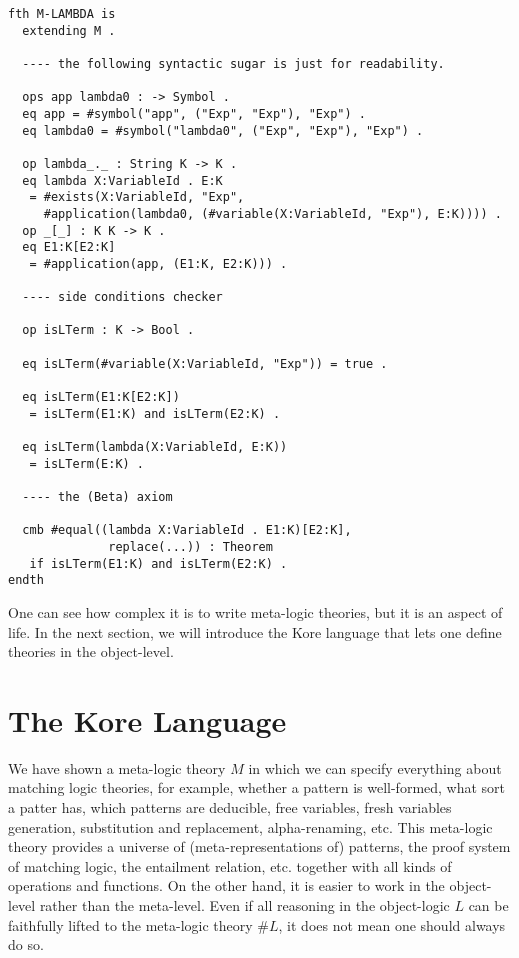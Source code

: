 \documentclass[UTF8]{article}
\theoremstyle{plain}
\theoremstyle{definition}
\theoremstyle{remark}
\begin{document}
\begin{Verbatim}[fontsize=\small]
fth M-LAMBDA is
  extending M .
  
  ---- the following syntactic sugar is just for readability. 

  ops app lambda0 : -> Symbol .
  eq app = #symbol("app", ("Exp", "Exp"), "Exp") .
  eq lambda0 = #symbol("lambda0", ("Exp", "Exp"), "Exp") .
  
  op lambda_._ : String K -> K .
  eq lambda X:VariableId . E:K
   = #exists(X:VariableId, "Exp", 
     #application(lambda0, (#variable(X:VariableId, "Exp"), E:K)))) .
  op _[_] : K K -> K .
  eq E1:K[E2:K] 
   = #application(app, (E1:K, E2:K))) .
   
  ---- side conditions checker
  
  op isLTerm : K -> Bool .

  eq isLTerm(#variable(X:VariableId, "Exp")) = true .
  
  eq isLTerm(E1:K[E2:K])
   = isLTerm(E1:K) and isLTerm(E2:K) .
   
  eq isLTerm(lambda(X:VariableId, E:K))
   = isLTerm(E:K) .
  
  ---- the (Beta) axiom

  cmb #equal((lambda X:VariableId . E1:K)[E2:K],
              replace(...)) : Theorem
   if isLTerm(E1:K) and isLTerm(E2:K) .
endth
\end{Verbatim}

One can see how complex it is to write meta-logic theories, but it is an aspect 
of life. 
In the next section, we will introduce the Kore language that lets one define 
theories in the object-level. 

\section{The Kore Language}

We have shown a meta-logic theory $M$ in which we can specify everything about 
matching logic theories, for example, whether a pattern is well-formed, what 
sort a patter has, which patterns are deducible, free variables, fresh 
variables generation, substitution and replacement, alpha-renaming, etc.
This meta-logic theory provides a universe of (meta-representations of) 
patterns, the proof system of matching logic, the entailment relation, etc. 
together with all kinds of operations and functions. 
On the other hand, it is easier to work in the object-level rather than the 
meta-level. 
Even if all reasoning in the object-logic $L$ can be faithfully lifted to the 
meta-logic theory $\#L$, it does not mean one should always do so. 
\end{document}
